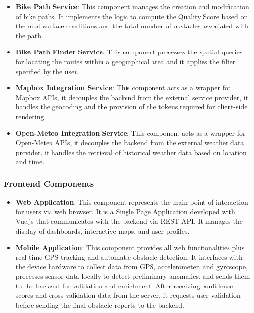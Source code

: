 \begin{itemize}
    \item \textbf{Bike Path Service}: This component manages the creation and modification of bike paths. It implements the logic to compute the Quality Score based on the road surface conditions and the total number of obstacles associated with the path.
    
    \item \textbf{Bike Path Finder Service}: This component processes the spatial queries for locating the routes within a geographical area and it applies the filter specified by the user.
    
    \item \textbf{Mapbox Integration Service}: This component acts as a wrapper for Mapbox APIs, it decouples the backend from the external service provider, it handles the geocoding and the provision of the tokens required for client-side rendering.

    \item \textbf{Open-Meteo Integration Service}: This component acts as a wrapper for Open-Meteo APIs, it decouples the backend from the external weather data provider, it handles the retrieval of historical weather data based on location and time.
\end{itemize}

\subsubsection{Frontend Components}
\begin{itemize}
    \item \textbf{Web Application}: This component represents the main point of interaction for users via web browser. It is a Single Page Application developed with Vue.js that communicates with the backend via REST API. It manages the display of dashboards, interactive maps, and user profiles.
    
    \item \textbf{Mobile Application}: This component provides all web functionalities plus real-time GPS tracking and automatic obstacle detection. It interfaces with the device hardware to collect data from GPS, accelerometer, and gyroscope, processes sensor data locally to detect preliminary anomalies, and sends them to the backend for validation and enrichment. After receiving confidence scores and cross-validation data from the server, it requests user validation before sending the final obstacle reports to the backend.
\end{itemize}

